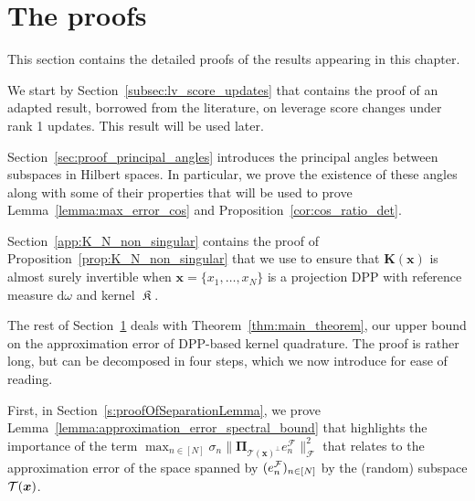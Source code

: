 \documentclass[twoside,11pt]{book}
\newtheorem{proposition}{Proposition}
\numberwithin{theorem}{chapter}
\numberwithin{definition}{chapter}
\numberwithin{proposition}{chapter}
\numberwithin{corollary}{chapter}
\numberwithin{example}{chapter}
\numberwithin{lemma}{chapter}
\numberwithin{assumption}{chapter}
\numberwithin{equation}{chapter}
\numberwithin{figure}{chapter}
\DeclareMathOperator{\DPP}{\mathrm{DPP}}
\DeclareMathOperator{\EX}{\mathbb{E}}
\DeclareMathOperator*{\KDPP}{\mathfrak{K}}
\begin{document}




\section{The proofs}
\label{s:proofs}
This section contains the detailed proofs of the results appearing in this chapter. 

We start by Section~\ref{subsec:lv_score_updates} that  contains the proof of an adapted result, borrowed from the literature, on leverage score changes under rank 1 updates. This result will be used later.

Section~\ref{sec:proof_principal_angles}  introduces the principal angles between subspaces in Hilbert spaces. In particular, we prove the existence of these angles along with some of their properties that will be used to prove Lemma~\ref{lemma:max_error_cos} and Proposition~\ref{cor:cos_ratio_det}.

Section~\ref{app:K_N_non_singular} contains the proof of Proposition~\ref{prop:K_N_non_singular} that we use to ensure that $\bm{K}(\bm{x})$ is almost surely invertible when $\bm{x} = \{x_{1}, \dots , x_{N}\}$ is a projection DPP with reference measure $\mathrm{d}\omega$ and kernel $\KDPP$. 


The rest of Section~\ref{s:proofs} deals with Theorem~\ref{thm:main_theorem}, our upper bound on the approximation error of DPP-based kernel quadrature. The proof is rather long, but can be decomposed in four steps, which we now introduce for ease of reading.

First, in Section~\ref{s:proofOfSeparationLemma}, we prove Lemma~\ref{lemma:approximation_error_spectral_bound} that highlights the importance of the term $\max_{n \in [N]} \sigma_{n} \|\bm{\Pi}_{\mathcal{T}(\bm{x})^{\perp}} e_{n}^{\mathcal{F}}\|_{\mathcal{F}}^{2}$ that relates to the approximation error of the space spanned by $(e^{\cal F}_n)_{n\in[N]}$ by the (random) subspace ${\cal T}(\bm{x})$. 
\end{document}
